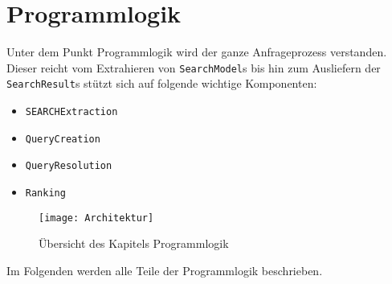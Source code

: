 
\chapter{Programmlogik}
Unter dem Punkt Programmlogik wird der ganze Anfrageprozess verstanden. Dieser reicht vom Extrahieren von \lstinline|SearchModel|s bis hin zum Ausliefern der \lstinline|SearchResult|s stützt sich auf folgende wichtige Komponenten:

\begin{itemize}
     \item \lstinline|SEARCHExtraction|
     \item \lstinline|QueryCreation|
     \item \lstinline|QueryResolution|
     \item \lstinline|Ranking|
\end{itemize}

\begin{figure}[htb]
  \centering
  \texttt{[image: Architektur]}
  \caption{Übersicht des Kapitels Programmlogik}
\end{figure}

Im Folgenden werden alle Teile der Programmlogik beschrieben.


\pagebreak
\clearpage



%
\pagebreak


\pagebreak

\pagebreak
\clearpage

